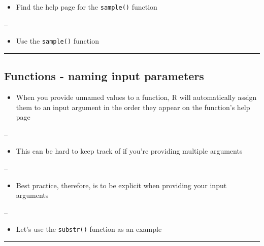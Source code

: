 \documentclass[]{article}
\providecommand{\tightlist}{%
  \setlength{\itemsep}{0pt}\setlength{\parskip}{0pt}}
\begin{document}
\begin{itemize}
\tightlist
\item
  Find the help page for the \texttt{sample()} function
\end{itemize}

--

\begin{itemize}
\tightlist
\item
  Use the \texttt{sample()} function
\end{itemize}

\begin{center}\rule{0.5\linewidth}{\linethickness}\end{center}

\hypertarget{functions---naming-input-parameters}{%
\subsection{Functions - naming input
parameters}\label{functions---naming-input-parameters}}

\begin{itemize}
\tightlist
\item
  When you provide unnamed values to a function, R will automatically
  assign them to an input argument in the order they appear on the
  function's help page
\end{itemize}

--

\begin{itemize}
\tightlist
\item
  This can be hard to keep track of if you're providing multiple
  arguments
\end{itemize}

--

\begin{itemize}
\tightlist
\item
  Best practice, therefore, is to be explicit when providing your input
  arguments
\end{itemize}

--

\begin{itemize}
\tightlist
\item
  Let's use the \texttt{substr()} function as an example
\end{itemize}

\begin{center}\rule{0.5\linewidth}{\linethickness}\end{center}
\end{document}
